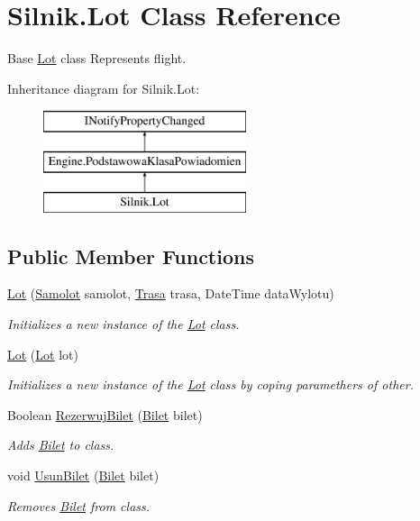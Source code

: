 \hypertarget{class_silnik_1_1_lot}{}\section{Silnik.\+Lot Class Reference}
\label{class_silnik_1_1_lot}


Base \mbox{\hyperlink{class_silnik_1_1_lot}{Lot}} class Represents flight.  


Inheritance diagram for Silnik.\+Lot\+:\begin{figure}[H]
\begin{center}
\leavevmode
\includegraphics[height=3.000000cm]{class_silnik_1_1_lot}
\end{center}
\end{figure}
\subsection*{Public Member Functions}
\begin{DoxyCompactItemize}
\item 
\mbox{\hyperlink{class_silnik_1_1_lot_a6ff9543d81086a250b1c2517135e2499}{Lot}} (\mbox{\hyperlink{class_silnik_1_1_samolot}{Samolot}} samolot, \mbox{\hyperlink{class_silnik_1_1_trasa}{Trasa}} trasa, Date\+Time data\+Wylotu)
\begin{DoxyCompactList}\small\item\em Initializes a new instance of the \mbox{\hyperlink{class_silnik_1_1_lot}{Lot}} class. \end{DoxyCompactList}\item 
\mbox{\hyperlink{class_silnik_1_1_lot_a68a9f13aa20a3cfab653d70c227b70ca}{Lot}} (\mbox{\hyperlink{class_silnik_1_1_lot}{Lot}} lot)
\begin{DoxyCompactList}\small\item\em Initializes a new instance of the \mbox{\hyperlink{class_silnik_1_1_lot}{Lot}} class by coping paramethers of other. \end{DoxyCompactList}\item 
Boolean \mbox{\hyperlink{class_silnik_1_1_lot_a2623d91a3f8fb942ece1fc785465e5a5}{Rezerwuj\+Bilet}} (\mbox{\hyperlink{class_silnik_1_1_bilet}{Bilet}} bilet)
\begin{DoxyCompactList}\small\item\em Adds \mbox{\hyperlink{class_silnik_1_1_bilet}{Bilet}} to class. \end{DoxyCompactList}\item 
void \mbox{\hyperlink{class_silnik_1_1_lot_afc434618b4f20dd9aeb67db0adda5252}{Usun\+Bilet}} (\mbox{\hyperlink{class_silnik_1_1_bilet}{Bilet}} bilet)
\begin{DoxyCompactList}\small\item\em Removes \mbox{\hyperlink{class_silnik_1_1_bilet}{Bilet}} from class. \end{DoxyCompactList}\end{DoxyCompactItemize}
